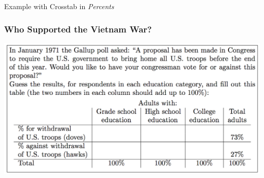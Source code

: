 \begin{frame}

\vspace{3em}
\huge \centering Example with Crosstab in \emph{Percents}



\end{frame}




\begin{frame}
\frametitle{Who Supported the Vietnam War?}
\begin{center}
\includegraphics[scale = 0.27]{./images/vietnam_question}
\end{center}



\end{frame}

